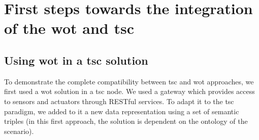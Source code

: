 \section{First steps towards the integration of the \acs{wot} and \acs{tsc}}
\label{sec:integration_wot_tsc}






\subsection{Using \acs{wot} in a \acs{tsc} solution}
\label{sec:wotints}
To demonstrate the complete compatibility between \ac{tsc} and \ac{wot} approaches, we first used a \ac{wot} solution in a \ac{tsc} node. We used a gateway \cite{guinard_resource_2010} which provides access to sensors and actuators through RESTful services. To adapt it to the \ac{tsc} paradigm, we added to it a new data representation using a set of semantic triples (in this first approach, the solution is dependent on the ontology of the scenario).

